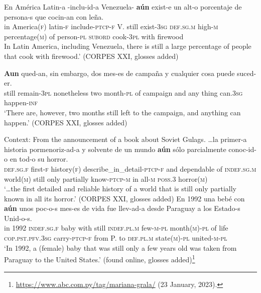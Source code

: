 \begin{exe}
	\ex\label{exAppendixSpanishAunScalar1}
	\gll En América Latin-a -inclu-id-a Venezuela- \textbf{aún} exist-e un alt-o porcentaje de persona-s que cocin-an con leña.\\
	in America(\textsc{f}) latin-\textsc{f} \phantom{-}include-\textsc{ptcp}-\textsc{f} V. still exist-3\textsc{sg} \textsc{def}.\textsc{sg}.\textsc{m} high-\textsc{m} percentage(\textsc{m}) of person-\textsc{pl} \textsc{subord} cook-3\textsc{pl} with firewood\\
	\glt In Latin America, including Venezuela, there is still a large percentage of people that cook with firewood.' (CORPES XXI, glosses added)

	\ex\label{exAppendixSpanishAunScalar2}
	\gll \textbf{Aun} qued-an, {sin embargo}, dos mes-es de campaña y cualquier cosa puede suced-er.\\
	still remain-3\textsc{pl} {nonetheless} two month-\textsc{pl} of campaign and any thing can.3\textsc{sg} happen-\textsc{inf}\\
	\glt \lq There are, however, two months still left to the campaign, and anything can happen.\rq{ }(CORPES XXI, glosses added)

	\ex\label{exAppendixSpanishAunScalar3}
	Context: From the announcement of a book about Soviet Gulags.
	\exi{}\gll  …la primer-a historia pormenoriz-ad-a y solvente de un mundo \textbf{aún} sólo parcialmente conoc-id-o en tod-o su horror.\\
	\phantom{…}\textsc{def}.\textsc{sg}.\textsc{f} first-\textsc{f} history(\textsc{f}) describe\_in\_detail-\textsc{ptcp}-\textsc{f} and dependable of \textsc{indef}.\textsc{sg}.\textsc{m} world(\textsc{m}) still only partially know-\textsc{ptcp}-\textsc{m} in all-\textsc{m} \textsc{poss}.3 horror(\textsc{m})\\
	\glt \lq …the first detailed and reliable history of a world that is still only partially known in all its horror.' (CORPES XXI, glosses added)
	\pagebreak
	\ex\label{exAppendixSpanishAunScalar4}
	\gll En 1992 una bebé con \textbf{aún} unos poc-o-s mes-es de vida fue llev-ad-a desde Paraguay a los Estado-s Unid-o-s.\\
	in 1992 \textsc{indef}.\textsc{sg}.\textsc{f} baby with still \textsc{indef}.\textsc{pl}.\textsc{m} few-\textsc{m}-\textsc{pl} month(\textsc{m})-\textsc{pl} of life \textsc{cop}.\textsc{pst}.\textsc{pfv}.3\textsc{sg} carry-\textsc{ptcp}-\textsc{f} from P. to \textsc{def}.\textsc{pl}.\textsc{m} state(\textsc{m})-\textsc{pl} united-\textsc{m}-\textsc{pl}\\
	\glt \lq In 1992, a (female) baby that was still only a few years old was taken from Paraguay to the United States.\rq{ }(found online, glosses added)\footnote{\url{https://www.abc.com.py/tag/mariana-grala/} (23 January, 2023).}
	

\end{exe}
